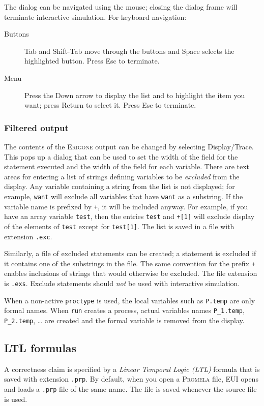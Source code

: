 \documentclass[11pt]{article}
\newcommand{\eri}{\textsc{Erigone}}
\newcommand{\prm}{\textsc{Promela}}
\newcommand{\eui}{\textsc{EUI}}
\newcommand{\p}[1]{\texttt{#1}}
\newcommand{\bu}[1]{\textsf{#1}}
\begin{document}
The dialog can be navigated using the mouse; closing the dialog frame
will terminate interactive simulation. For keyboard navigation:
\begin{description}
\item[Buttons] \bu{Tab} and \bu{Shift-Tab} move through the buttons
and \bu{Space} selects the highlighted button. Press \bu{Esc} to terminate.
\item[Menu] Press the \bu{Down arrow} to display the list and to highlight the
item you want; press \bu{Return} to select it. Press \bu{Esc} to terminate.
\end{description}

\subsubsection{Filtered output}\label{s.filter}
The contents of the \eri{} output can be changed by selecting 
\bu{Display/Trace}. This pops up a dialog that can be used to set the
width of the field for the statement executed and the width of the field
for each variable. There are text areas for entering a list of strings defining 
variables to be \emph{excluded} from the display. Any variable containing 
a string from the list is not displayed; for example, \p{want} will 
exclude all variables that have \p{want} as a substring. If the variable name is 
prefixed by \p{+}, it will be included anyway. For example, if you have an 
array variable \p{test}, then the entries \p{test} and \p{+[1]} will 
exclude display of the elements of \p{test} except for \p{test[1]}. The 
list is saved in a file with extension \p{.exc}.

Similarly, a file of excluded statements can be created; a statement is
excluded if it contains one of the substrings in the file. The same
convention for the prefix \p{+} enables inclusions of strings that would
otherwise be excluded. The file extension is \p{.exs}. \bu{Exclude
statements} should \emph{not} be used with interactive simulation.

When a non-active \p{proctype} is used, the local variables such as
\p{P.temp} are only formal names. When \p{run} creates a process, actual
variables names \p{P\_1.temp}, \p{P\_2.temp}, \ldots{} are created and
the formal variable is removed from the display.

\subsection{LTL formulas}
A correctness claim is specified by a \emph{Linear Temporal Logic (LTL)}
formula that is saved with extension \p{.prp}.
By default, when you open a \prm{} file,
\eui{} opens and loads a \p{.prp} file of the same name.
The file is saved whenever the source file is used.
\end{document}
